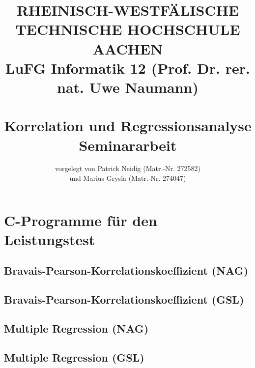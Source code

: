 \documentclass{article}
\title{
{\bf \scriptsize RHEINISCH-WESTF\"ALISCHE TECHNISCHE HOCHSCHULE AACHEN \\
LuFG Informatik 12 (Prof. Dr. rer. nat. Uwe Naumann)}
\vspace{.5cm} \\
\epsfig{file=figures/STCE_Logo_WWW.eps,width=.7\textwidth}
\vspace{1cm} \\
{\bf \Large Korrelation und Regressionsanalyse} \\
{\large Seminararbeit} 
}
\author{vorgelegt von Patrick Neidig (Matr.-Nr. 272582)\\
	und Marius Grysla (Matr.-Nr. 274047)}
\begin{document}


\pagestyle{headings}

\maketitle

\newpage
\tableofcontents

\newpage














\appendix

\lstset{basicstyle=\tiny, numberstyle=\tiny}

\section{C-Programme für den Leistungstest}

\subsection{Bravais-Pearson-Korrelationskoeffizient (NAG)}


\subsection{Bravais-Pearson-Korrelationskoeffizient (GSL)}


\subsection{Multiple Regression (NAG)}
\label{sec:appendix:mul_reg_nag}


\subsection{Multiple Regression (GSL)}
\label{sec:appendix:mul_reg_gsl}

\end{document}
